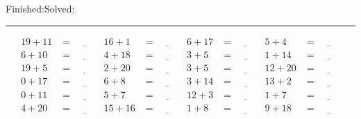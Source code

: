 \documentclass{article}
\begin{document}
\begin{sloppy}
\begin{center}
{\selectfont {Started:}\underline{\hspace{1.5cm}}{Finished:}\underline{\hspace{1.5cm}}{Solved:}\underline{\hspace{1.5cm}}}
\end{center}
\hrule
\begin{align*}
    {19} + {11} &= \underline{\hspace{1cm}} & {16} + {1} &= \underline{\hspace{1cm}} & {6} + {17} &= \underline{\hspace{1cm}} & {5} + {4} &= \underline{\hspace{1cm}} \\
    {6} + {10} &= \underline{\hspace{1cm}} & {4} + {18} &= \underline{\hspace{1cm}} & {3} + {5} &= \underline{\hspace{1cm}} & {1} + {14} &= \underline{\hspace{1cm}} \\
    {19} + {5} &= \underline{\hspace{1cm}} & {2} + {20} &= \underline{\hspace{1cm}} & {3} + {5} &= \underline{\hspace{1cm}} & {12} + {20} &= \underline{\hspace{1cm}} \\
    {0} + {17} &= \underline{\hspace{1cm}} & {6} + {8} &= \underline{\hspace{1cm}} & {3} + {14} &= \underline{\hspace{1cm}} & {13} + {2} &= \underline{\hspace{1cm}} \\
    {0} + {11} &= \underline{\hspace{1cm}} & {5} + {7} &= \underline{\hspace{1cm}} & {12} + {3} &= \underline{\hspace{1cm}} & {1} + {7} &= \underline{\hspace{1cm}} \\
    {4} + {20} &= \underline{\hspace{1cm}} & {15} + {16} &= \underline{\hspace{1cm}} & {1} + {8} &= \underline{\hspace{1cm}} & {9} + {18} &= \underline{\hspace{1cm}} \\

\end{align*}
\end{sloppy}
\end{document}
